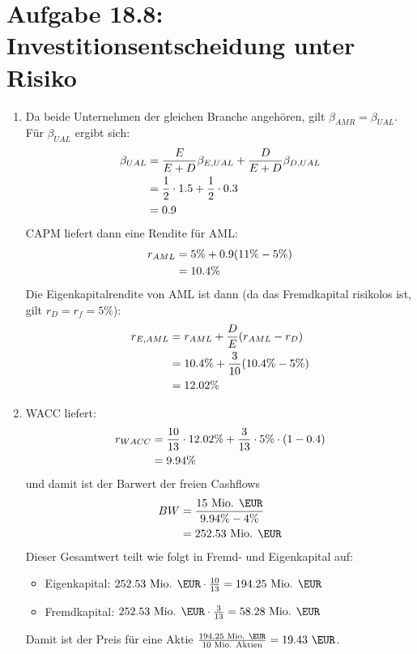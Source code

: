 \documentclass{article}
\begin{document}
	\section*{Aufgabe 18.8: Investitionsentscheidung unter Risiko}
	\begin{enumerate}[label=(\alph*)]
		\item Da beide Unternehmen der gleichen Branche angehören, gilt $\beta_{AMR}=\beta_{UAL}$. Für $\beta_{UAL}$ ergibt sich:
		\begin{align}
			\beta_{UAL} &= \frac{E}{E+D}\beta_{E,UAL} + \frac{D}{E+D}\beta_{D,UAL} \notag \\
			&= \frac{1}{2}\cdot 1.5 + \frac{1}{2}\cdot 0.3 \notag \\
			&= 0.9 \notag
		\end{align}
		CAPM liefert dann eine Rendite für AML:
		\begin{align}
			r_{AML} &= 5\% + 0.9(11\%-5\%) \notag \\
			&= 10.4\% \notag
		\end{align}
		Die Eigenkapitalrendite von AML ist dann (da das Fremdkapital risikolos ist, gilt $r_D=r_f=5\%$):
		\begin{align}
			r_{E,AML} &= r_{AML} + \frac{D}{E}(r_{AML}-r_D) \notag \\
			&= 10.4\% + \frac{3}{10}(10.4\%-5\%) \notag \\
			&= 12.02\% \notag
		\end{align}
		\item WACC liefert:
		\begin{align}
			r_{WACC} &= \frac{10}{13} \cdot 12.02\% + \frac{3}{13}\cdot 5\%\cdot (1-0.4) \notag \\
			&= 9.94\% \notag
		\end{align}
		und damit ist der Barwert der freien Cashflows
		\begin{align}
			BW &= \frac{15\text{ Mio. \EUR}}{9.94\% - 4\%} \notag \\
			&= 252.53\text{ Mio. \EUR} \notag
		\end{align}
		Dieser Gesamtwert teilt wie folgt in Fremd- und Eigenkapital auf:
		\begin{itemize}
			\item Eigenkapital: $252.53\text{ Mio. \EUR}\cdot \frac{10}{13}=194.25\text{ Mio. \EUR}$
			\item Fremdkapital: $252.53\text{ Mio. \EUR}\cdot \frac{3}{13}=58.28\text{ Mio. \EUR}$
		\end{itemize}
		Damit ist der Preis für eine Aktie $\frac{194.25\text{ Mio. \EUR}}{10\text{ Mio. Aktien}}=19.43\text{ \EUR}$.
	\end{enumerate}
\end{document}
